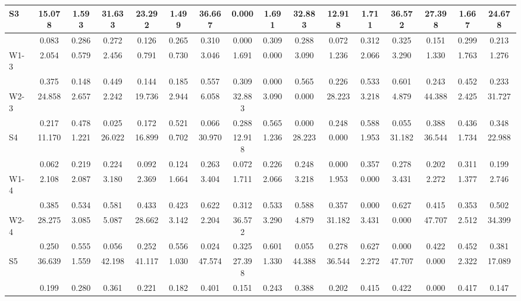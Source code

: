 \begin{table*}[h!]
\begin{center}
\begin{tabular}{| l | c | c | c | c | c | c | c | c | c | c | c | c | c | c | c |}
S3 & 15.078  & 1.593  & 31.633  & 23.292  & 1.499  & 36.667  & 0.000  & 1.691  & 32.883  & 12.918  & 1.711  & 36.572  & 27.398  & 1.667  & 24.678 \\\hline
 & 0.083  & 0.286  & 0.272  & 0.126  & 0.265  & 0.310  & 0.000  & 0.309  & 0.288  & 0.072  & 0.312  & 0.325  & 0.151  & 0.299  & 0.213 \\\hline
W1-3 & 2.054  & 0.579  & 2.456  & 0.791  & 0.730  & 3.046  & 1.691  & 0.000  & 3.090  & 1.236  & 2.066  & 3.290  & 1.330  & 1.763  & 1.276 \\\hline
 & 0.375  & 0.148  & 0.449  & 0.144  & 0.185  & 0.557  & 0.309  & 0.000  & 0.565  & 0.226  & 0.533  & 0.601  & 0.243  & 0.452  & 0.233 \\\hline
W2-3 & 24.858  & 2.657  & 2.242  & 19.736  & 2.944  & 6.058  & 32.883  & 3.090  & 0.000  & 28.223  & 3.218  & 4.879  & 44.388  & 2.425  & 31.727 \\\hline
 & 0.217  & 0.478  & 0.025  & 0.172  & 0.521  & 0.066  & 0.288  & 0.565  & 0.000  & 0.248  & 0.588  & 0.055  & 0.388  & 0.436  & 0.348 \\\hline
S4 & 11.170  & 1.221  & 26.022  & 16.899  & 0.702  & 30.970  & 12.918  & 1.236  & 28.223  & 0.000  & 1.953  & 31.182  & 36.544  & 1.734  & 22.988 \\\hline
 & 0.062  & 0.219  & 0.224  & 0.092  & 0.124  & 0.263  & 0.072  & 0.226  & 0.248  & 0.000  & 0.357  & 0.278  & 0.202  & 0.311  & 0.199 \\\hline
W1-4 & 2.108  & 2.087  & 3.180  & 2.369  & 1.664  & 3.404  & 1.711  & 2.066  & 3.218  & 1.953  & 0.000  & 3.431  & 2.272  & 1.377  & 2.746 \\\hline
 & 0.385  & 0.534  & 0.581  & 0.433  & 0.423  & 0.622  & 0.312  & 0.533  & 0.588  & 0.357  & 0.000  & 0.627  & 0.415  & 0.353  & 0.502 \\\hline
W2-4 & 28.275  & 3.085  & 5.087  & 28.662  & 3.142  & 2.204  & 36.572  & 3.290  & 4.879  & 31.182  & 3.431  & 0.000  & 47.707  & 2.512  & 34.399 \\\hline
 & 0.250  & 0.555  & 0.056  & 0.252  & 0.556  & 0.024  & 0.325  & 0.601  & 0.055  & 0.278  & 0.627  & 0.000  & 0.422  & 0.452  & 0.381 \\\hline
S5 & 36.639  & 1.559  & 42.198  & 41.117  & 1.030  & 47.574  & 27.398  & 1.330  & 44.388  & 36.544  & 2.272  & 47.707  & 0.000  & 2.322  & 17.089 \\\hline
 & 0.199  & 0.280  & 0.361  & 0.221  & 0.182  & 0.401  & 0.151  & 0.243  & 0.388  & 0.202  & 0.415  & 0.422  & 0.000  & 0.417  & 0.147 \\\hline

\end{tabular}
\end{center}
\end{table*}
